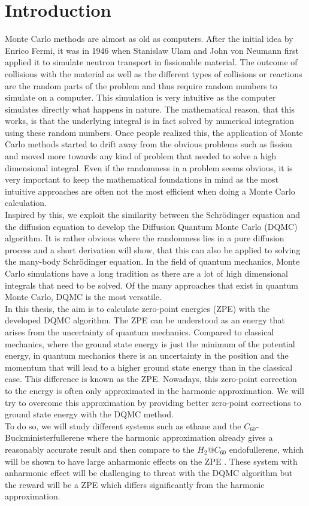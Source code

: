 \documentclass [12pt]{report}
\begin{document}
\chapter{Introduction}
Monte Carlo methods are almost as old as computers. After the initial idea by Enrico Fermi, it was in 1946 when Stanislaw Ulam and John von Neumann first applied it to simulate neutron transport in fissionable material\cite{monte_carlo}. The outcome of collisions with the material as well as the different types of collisions or reactions are the random parts of the problem and thus require random numbers to simulate on a computer. This simulation is very intuitive as the computer simulates directly what happens in nature. The mathematical reason, that this works, is that the underlying integral is in fact solved by numerical integration using these random numbers. Once people realized this, the application of Monte Carlo methods started to drift away from the obvious problems such as fission and moved more towards any kind of problem that needed to solve a high dimensional integral. Even if the randomness in a problem seems obvious, it is very important to keep the mathematical foundations in mind as the most intuitive approaches are often not the most efficient when doing a Monte Carlo calculation.\\
Inspired by this, we exploit the similarity between the Schrödinger equation and the diffusion equation to develop the Diffusion Quantum Monte Carlo (DQMC) algorithm. It is rather obvious where the randomness lies in a pure diffusion process and a short derivation will show, that this can also be applied to solving the many-body Schrödinger equation. In the field of quantum mechanics, Monte Carlo simulations have a long tradition as there are a lot of high dimensional integrals that need to be solved. Of the many approaches that exist in quantum Monte Carlo, DQMC is the most versatile.\\
In this thesis, the aim is to calculate zero-point energies (ZPE) with the developed DQMC algorithm. The ZPE can be understood as an energy that arises from the uncertainty of quantum mechanics. Compared to classical mechanics, where the ground state energy is just the minimum of the potential energy, in quantum mechanics there is an uncertainty in the position and the momentum that will lead to a higher ground state energy than in the classical case. This difference is known as the ZPE. Nowadays, this zero-point correction to the energy is often only approximated in the harmonic approximation. We will try to overcome this approximation by providing better zero-point corrections to ground state energy with the DQMC method.\\
To do so, we will study different systems such as ethane  and the $C_{60}$-Buckministerfullerene where the harmonic approximation already gives a reasonably accurate result and then compare to the $H_2@C_{60}$ endofullerene, which will be shown to have large anharmonic effects on the ZPE \cite{anharmonic}. These system with anharmonic effect will be challenging to threat with the DQMC algorithm but the reward will be a ZPE which differs significantly from the harmonic approximation.
\end{document}
